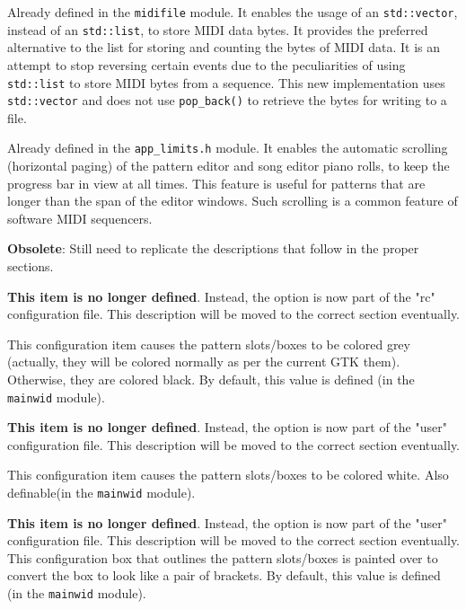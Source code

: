         Already defined in the \texttt{midifile} module.
        It enables the usage of an
        \texttt{std::vector}, instead of an \texttt{std::list},
        to store MIDI data bytes.
        It provides the preferred alternative to the list for storing and
        counting the bytes of MIDI data.  It is an attempt to stop reversing
        certain events due to the peculiarities of using \texttt{std::list} to
        store MIDI bytes from a sequence.  This new implementation uses
        \texttt{std::vector} and does not use \texttt{pop\_back()} to retrieve
        the bytes for writing to a file.

        Already defined in the \texttt{app\_limits.h} module.
        It enables the automatic scrolling (horizontal paging) of the pattern
        editor and song editor piano rolls, to keep the progress bar in view at
        all times.  This feature is useful for patterns that are longer than
        the span of the editor windows.  Such scrolling is a common
        feature of software MIDI sequencers.

   \textbf{Obsolete}:  Still need to replicate the descriptions that follow
      in the proper sections.

        \textbf{This item is no longer defined}.
        Instead, the option is now part of the "rc" configuration file.  This
        description will be moved to the correct section eventually.

        This configuration item causes the pattern slots/boxes to be colored
        grey (actually, they will be colored normally as per the current GTK
        them).  Otherwise, they are colored black.  By default, this value is
        defined (in the \texttt{mainwid} module).

        \textbf{This item is no longer defined}.
        Instead, the option is now part of the "user" configuration file.  This
        description will be moved to the correct section eventually.

        This configuration item causes the pattern slots/boxes to be colored
        white.  Also definable(in the \texttt{mainwid} module).

        \textbf{This item is no longer defined}.
        Instead, the option is now part of the "user" configuration file.  This
        description will be moved to the correct section eventually.
        This configuration box that outlines the pattern slots/boxes is
        painted over to convert the box to look like a pair of brackets.
        By default, this value is defined (in the \texttt{mainwid} module).

